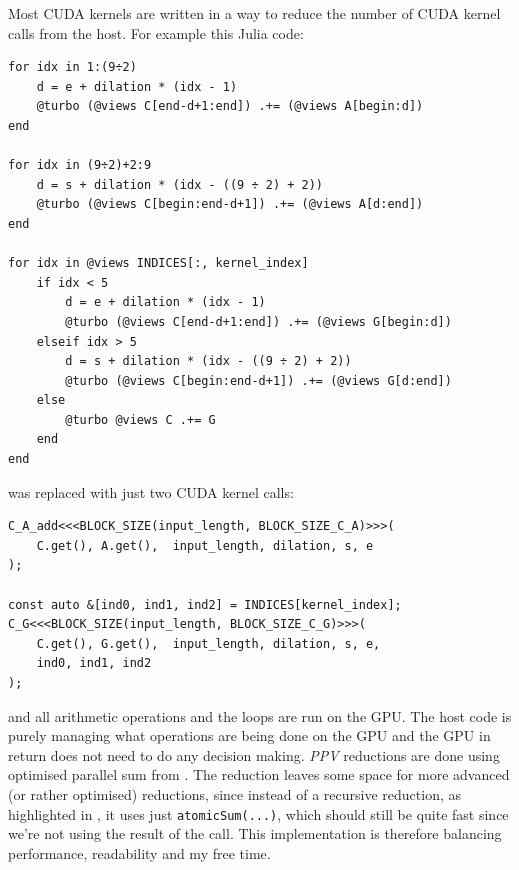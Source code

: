\documentclass{article}
\begin{document}
Most CUDA kernels are written in a way to reduce the number of CUDA kernel calls from the host. For example this Julia code:
\begin{verbatim}
for idx in 1:(9÷2)
    d = e + dilation * (idx - 1)
    @turbo (@views C[end-d+1:end]) .+= (@views A[begin:d])
end

for idx in (9÷2)+2:9
    d = s + dilation * (idx - ((9 ÷ 2) + 2))
    @turbo (@views C[begin:end-d+1]) .+= (@views A[d:end])
end

for idx in @views INDICES[:, kernel_index]
    if idx < 5
        d = e + dilation * (idx - 1)
        @turbo (@views C[end-d+1:end]) .+= (@views G[begin:d])
    elseif idx > 5
        d = s + dilation * (idx - ((9 ÷ 2) + 2))
        @turbo (@views C[begin:end-d+1]) .+= (@views G[d:end])
    else
        @turbo @views C .+= G
    end
end
\end{verbatim}
was replaced with just two CUDA kernel calls:
\begin{verbatim}
C_A_add<<<BLOCK_SIZE(input_length, BLOCK_SIZE_C_A)>>>(
    C.get(), A.get(),  input_length, dilation, s, e
);

const auto &[ind0, ind1, ind2] = INDICES[kernel_index];
C_G<<<BLOCK_SIZE(input_length, BLOCK_SIZE_C_G)>>>(
    C.get(), G.get(),  input_length, dilation, s, e,
    ind0, ind1, ind2
);
\end{verbatim}
and all arithmetic operations and the loops are run on the GPU. The host code is purely managing what operations are being done on the GPU and the GPU in return does not need to do any decision making. \emph{PPV} reductions are done using optimised parallel sum from \cite{nvidiaparallelsumslides}. The reduction leaves some space for more advanced (or rather optimised) reductions, since instead of a recursive reduction, as highlighted in \cite{nvidiaparallelsum}, it uses just \texttt{atomicSum(...)}, which should still be quite fast since we're not using the result of the call. This implementation is therefore balancing performance, readability and my free time.
\end{document}
